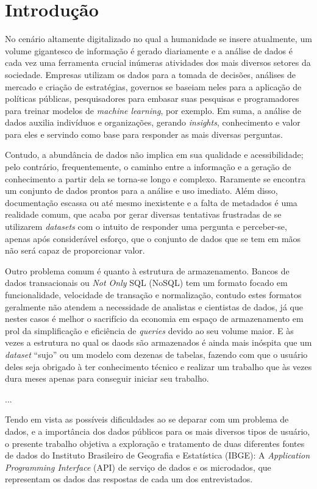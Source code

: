 \chapter{Introdução}

    No cenário altamente digitalizado no qual a humanidade se insere atualmente, um volume gigantesco de informação é gerado diariamente e a análise de dados é cada vez uma ferramenta crucial inúmeras atividades dos mais diversos setores da sociedade. Empresas utilizam os dados para a tomada de decisões, análises de mercado e criação de estratégias, governos se baseiam neles para a aplicação de políticas públicas, pesquisadores para embasar suas pesquisas e programadores para treinar modelos de \textit{machine learning}, por exemplo. Em suma, a análise de dados auxilia indivíduos e organizações, gerando \textit{insights}, conhecimento e valor para eles e servindo como base para responder as mais diversas perguntas.

    Contudo, a abundância de dados não implica em sua qualidade e acessibilidade; pelo contrário, frequentemente, o caminho entre a informação e a geração de conhecimento a partir dela se torna-se longo e complexo. Raramente se encontra um conjunto de dados prontos para a análise e uso imediato. Além disso, documentação escassa ou até mesmo inexistente e a falta de metadados é uma realidade comum, que acaba por gerar diversas tentativas frustradas de se utilizarem \textit{datasets} com o intuito de responder uma pergunta e perceber-se, apenas após considerável esforço, que o conjunto de dados que se tem em mãos não será capaz de proporcionar valor.

    Outro problema comum é quanto à estrutura de armazenamento. Bancos de dados transacionais ou \textit{Not Only} SQL (NoSQL) tem um formato focado em funcionalidade, velocidade de transação e normalização, contudo estes formatos geralmente não atendem a necessidade de analistas e cientistas de dados, já que nestes casos é melhor o sacrifício da economia em espaço de armazenamento em prol da simplificação e eficiência de \textit{queries} devido ao seu volume maior. E às vezes a estrutura no qual os daods são armazenados é ainda mais inóspita que um \textit{dataset} ``sujo'' ou um modelo com dezenas de tabelas, fazendo com que o usuário deles seja obrigado à ter conhecimento técnico e realizar um trabalho que às vezes dura meses apenas para conseguir iniciar seu trabalho.

    ...

    Tendo em vista as possíveis dificuldades ao se deparar com um problema de dados, e a importância dos dados públicos para os mais diversos tipos de usuário, o presente trabalho objetiva a exploração e tratamento de duas diferentes fontes de dados do Instituto Brasileiro de Geografia e Estatística (IBGE): A \textit{Application Programming Interface} (API) de serviço de dados \cite{API-IBGE} e os microdados, que representam os dados das respostas de cada um dos entrevistados.


